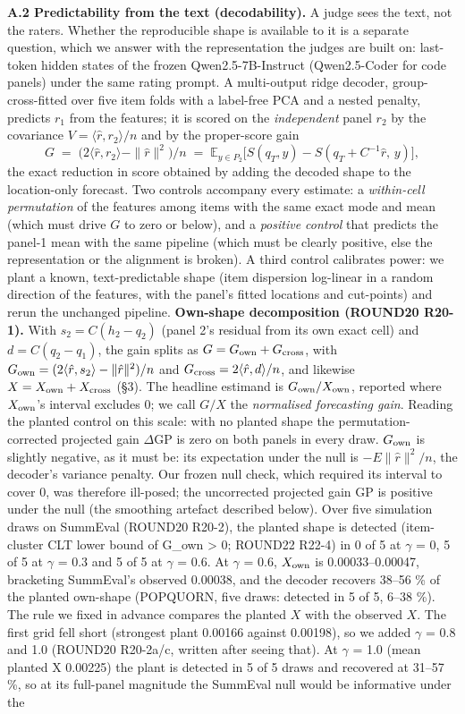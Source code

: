 \documentclass[10pt,twocolumn]{article}
\begin{document}
\textbf{A.2 Predictability from the text (decodability).} A judge sees the text, not the raters. Whether the reproducible shape is available to it is a separate question, which we answer with the representation the judges are built on: last-token hidden states of the frozen Qwen2.5-7B-Instruct (Qwen2.5-Coder for code panels) under the same rating prompt. A multi-output ridge decoder, group-cross-fitted over five item folds with a label-free PCA and a nested penalty, predicts \(r_1\) from the features; it is scored on the \emph{independent} panel \(r_2\) by the covariance \(V=\langle\hat r,r_2\rangle/n\) and by the proper-score gain \[G \;=\; \big(2\langle \hat r, r_2\rangle - \|\hat r\|^2\big)/n \;=\; \mathbb E_{y\in P_2}\big[S(q_T,y) - S(q_T + C^{-1}\hat r,\,y)\big],\] the exact reduction in score obtained by adding the decoded shape to the location-only forecast. Two controls accompany every estimate: a \emph{within-cell permutation} of the features among items with the same exact mode and mean (which must drive \(G\) to zero or below), and a \emph{positive control} that predicts the panel-1 mean with the same pipeline (which must be clearly positive, else the representation or the alignment is broken). A third control calibrates power: we plant a known, text-predictable shape (item dispersion log-linear in a random direction of the features, with the panel's fitted locations and cut-points) and rerun the unchanged pipeline. \textbf{Own-shape decomposition (ROUND20 R20-1).} With \(s_2=C(h_2-q_2)\) (panel 2's residual from its own exact cell) and \(d=C(q_2-q_1)\), the gain splits as \(G=G_{\rm own}+G_{\rm cross}\), with \(G_{\rm own}=(2\langle\hat r,s_2\rangle-\|\hat r\|^2)/n\) and \(G_{\rm cross}=2\langle\hat r,d\rangle/n\), and likewise \(X=X_{\rm own}+X_{\rm cross}\) (\S{}3). The headline estimand is \(G_{\rm own}/X_{\rm own}\), reported where \(X_{\rm own}\)'s interval excludes 0; we call \(G/X\) the \emph{normalised forecasting gain}. Reading the planted control on this scale: with no planted shape the permutation-corrected projected gain $\Delta$GP is zero on both panels in every draw. \(G_{\rm own}\) is slightly negative, as it must be: its expectation under the null is \(-E\|\hat r\|^2/n\), the decoder's variance penalty. Our frozen null check, which required its interval to cover 0, was therefore ill-posed; the uncorrected projected gain GP is positive under the null (the smoothing artefact described below). Over five simulation draws on SummEval (ROUND20 R20-2), the planted shape is detected (item-cluster CLT lower bound of G\_own \textgreater{} 0; ROUND22 R22-4) in 0 of 5 at $\gamma$ = 0, 5 of 5 at $\gamma$ = 0.3 and 5 of 5 at $\gamma$ = 0.6. At $\gamma$ = 0.6, \(X_{\rm own}\) is 0.00033--0.00047, bracketing SummEval's observed 0.00038, and the decoder recovers 38--56 \% of the planted own-shape (POPQUORN, five draws: detected in 5 of 5, 6--38 \%). The rule we fixed in advance compares the planted \(X\) with the observed \(X\). The first grid fell short (strongest plant 0.00166 against 0.00198), so we added $\gamma$ = 0.8 and 1.0 (ROUND20 R20-2a/c, written after seeing that). At $\gamma$ = 1.0 (mean planted X 0.00225) the plant is detected in 5 of 5 draws and recovered at 31--57 \%, so at its full-panel magnitude the SummEval null would be informative under the 
\end{document}
